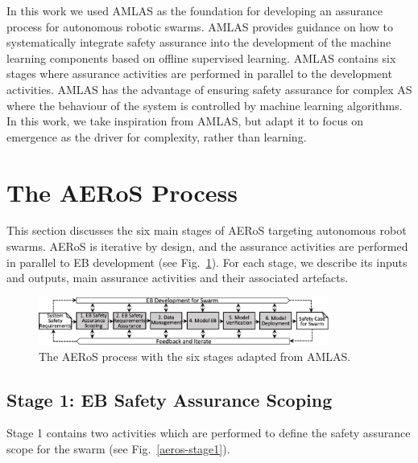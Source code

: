 \documentclass{article}
\begin{document}
In this work we used AMLAS \cite{Hawkins2021} as the foundation for developing an assurance process for autonomous robotic swarms. 
AMLAS provides guidance on how to systematically integrate safety assurance into the development of the machine learning components based on offline supervised learning. 
AMLAS contains six stages where assurance activities are performed in parallel to the development activities. 
AMLAS has the advantage of ensuring safety assurance for complex AS where the behaviour of the system is controlled by machine learning algorithms. 
In this work, we take inspiration from AMLAS, but adapt it to focus on emergence as the driver for complexity, rather than learning. 

\section{The AERoS Process}\label{framework}
This section discusses the six main stages of AERoS targeting autonomous robot swarms. AERoS is iterative by design, and the assurance activities are performed in parallel to EB development (see Fig.~\ref{aeros-process}). For each stage, we describe its inputs and outputs, main assurance activities and their associated artefacts. 
\begin{figure}[!t]
	\centering
	\includegraphics[width=0.85\textwidth]{AERoS-Process.pdf}
	\caption{The AERoS process with the six stages adapted from AMLAS.}
	\label{aeros-process}
\end{figure}

\subsection{Stage 1: EB Safety Assurance Scoping} \label{framework-stage1}
Stage 1 contains two activities which are performed to define the safety assurance scope for the swarm (see Fig.~\ref{aeros-stage1}). 
\end{document}
